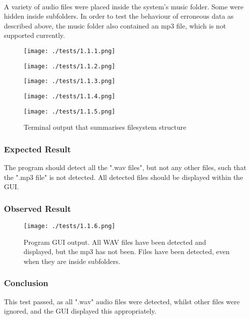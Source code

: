 \paragraph{}
A variety of audio files were placed inside the system's music folder. Some were hidden inside subfolders. In order to test the behaviour of erroneous data as described above, the music folder also contained an mp3 file, which is not supported currently.

\begin{figure}[H]
	\texttt{[image: ./tests/1.1.1.png]}
\end{figure}
\begin{figure}[H]
	\texttt{[image: ./tests/1.1.2.png]}
\end{figure}
\begin{figure}[H]
	\texttt{[image: ./tests/1.1.3.png]}
\end{figure}
\begin{figure}[H]
	\texttt{[image: ./tests/1.1.4.png]}
\end{figure}
\begin{figure}[H]
	\texttt{[image: ./tests/1.1.5.png]}
	\caption{Terminal output that summarises filesystem structure}
\end{figure}

\subsubsection*{Expected Result}
The program should detect all the ".wav files", but not any other files, such that the ".mp3 file" is not detected. All detected files should be displayed within the GUI.

\subsubsection*{Observed Result}
\label{sec:evidence1.1}
\begin{figure}[H]
	\texttt{[image: ./tests/1.1.6.png]}
	\caption{Program GUI output. All WAV files have been detected and displayed, but the mp3 has not been. Files have been detected, even when they are inside subfolders.}
\end{figure}

\subsubsection*{Conclusion}
This test passed, as all ".wav" audio files were detected, whilst other files were ignored, and the GUI displayed this appropriately.


